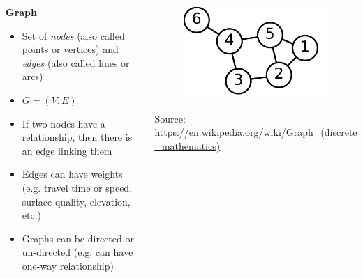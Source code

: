 \documentclass[aspectratio=169]{beamer}
\begin{document}
\begin{frame}
	
	\begin{columns}
		
		\begin{column}{0.5\textwidth}
			
			\textbf{Graph}
			\begin{itemize}
				\item Set of \textit{nodes} (also called points or vertices) and \textit{edges} (also called lines or arcs)
				\item $G = (V, E)$
				\item If two nodes have a relationship, then there is an edge linking them
				\item Edges can have weights (e.g. travel time or speed, surface quality, elevation, etc.)
				\item Graphs can be directed or un-directed (e.g. can have one-way relationship)
			\end{itemize}
			
		\end{column}
		
		\begin{column}{0.4\textwidth}
			\begin{figure}
				\centering
				\includegraphics[width=0.9\linewidth]{images/simple_graph}
			\end{figure}
			\tiny Source: \url{https://en.wikipedia.org/wiki/Graph_(discrete_mathematics)}
		\end{column}	
		
	\end{columns}
	
\end{frame}
\end{document}
